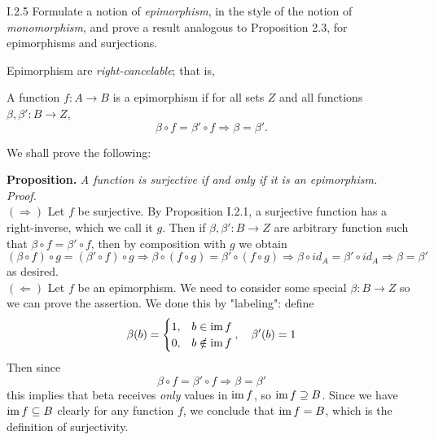 \begin{problem}{I.2.5}
Formulate a notion of \emph{epimorphism}, in the style of the notion of \emph{monomorphism}, and prove a result analogous to Proposition 2.3, for epimorphisms and surjections.
\end{problem}
\begin{solution}
Epimorphism are \emph{right-cancelable}; that is,
\begin{center}
A function $f : A \to B$ is a epimorphism if for all sets $Z$ and all functions $\beta, \beta' : B \to Z$, 
\[
\beta \circ f = \beta' \circ f \Longrightarrow \beta = \beta'.
\]
\end{center}
We shall prove the following:

\noindent \textbf{Proposition. }\textit{A function is surjective if and only if it is an epimorphism.} \\
\textit{Proof. } \\
$(\Rightarrow)$ Let $f$ be surjective. By Proposition I.2.1, a surjective function has a right-inverse, which we call it $g$. Then if $\beta, \beta' : B \to Z$ are arbitrary function such that $\beta \circ f = \beta' \circ f$, then by composition with $g$ we obtain
\[
(\beta \circ f) \circ g=  (\beta' \circ f) \circ g \Rightarrow \beta \circ (f \circ g)=  \beta' \circ  (f \circ g) \Rightarrow \beta \circ id_A = \beta' \circ id_A \Rightarrow \beta = \beta'
\]
as desired. \\
$(\Leftarrow)$ Let $f$ be an epimorphism. We need to consider some special $\beta:B \to Z$ so we can prove the assertion. We done this by "labeling": define
\[
\beta(b) = \begin{cases}
    1, &b \in \operatorname{im} f \\
    0, &b \notin \operatorname{im} f
\end{cases}, \quad \beta'(b) = 1
\]
Then since 
\[
\beta \circ f = \beta' \circ f  \Rightarrow \beta = \beta'
\] 
this implies that beta receives \emph{only} values in $\operatorname{im} f$, so $\operatorname{im} f \supseteq B$. Since we have $\operatorname{im} f \subseteq B$ clearly for any function $f$, we conclude that $\operatorname{im} f = B$, which is the definition of surjectivity.
\end{solution}

